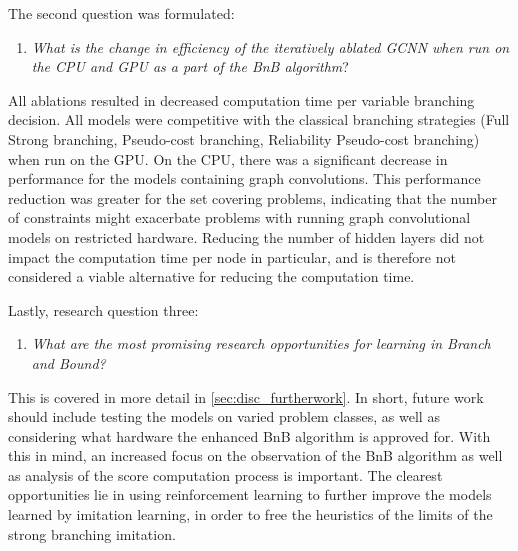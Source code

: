 The second question was formulated:
%
\begin{enumerate}[resume*]
    \item \textit{What is the change in efficiency of the iteratively ablated \gls{GCNN} when run on the \gls{CPU} and \gls{GPU} as a part of the \gls{BnB} algorithm}?
\end{enumerate}
%
All ablations resulted in decreased computation time per variable branching decision. All models were competitive with the classical branching strategies (Full Strong branching, Pseudo-cost branching, Reliability Pseudo-cost branching) when run on the \gls{GPU}. On the \gls{CPU}, there was a significant decrease in performance for the models containing graph convolutions. This performance reduction was greater for the set covering problems, indicating that the number of constraints might exacerbate problems with running graph convolutional models on restricted hardware. Reducing the number of hidden layers did not impact the computation time per node in particular, and is therefore not considered a viable alternative for reducing the computation time.    

Lastly, research question three:
%
\begin{enumerate}[resume*]
    \item \textit{What are the most promising research opportunities for learning in Branch and Bound?}
\end{enumerate}
%
This is covered in more detail in \cref{sec:disc_furtherwork}. In short, future work should include testing the models on varied problem classes, as well as considering what hardware the enhanced \gls{BnB} algorithm is approved for. With this in mind, an increased focus on the observation of the \gls{BnB} algorithm as well as analysis of the score computation process is important. The clearest opportunities lie in using reinforcement learning to further improve the models learned by imitation learning, in order to free the heuristics of the limits of the strong branching imitation. 

